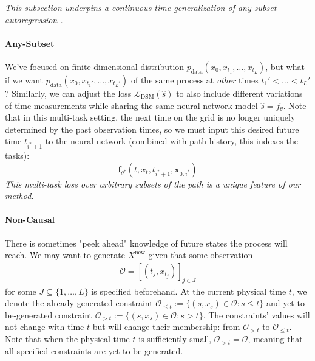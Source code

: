 \documentclass{article}
\begin{document}
\textit{This subsection underpins a continuous-time generalization of any-subset autoregression \cite{guo2025reviving, shih2022training}.}

\paragraph{Any-Subset}

We've focused on finite-dimensional  distribution $p_\text{data}(x_0, x_{t_1}, \ldots, x_{t_L})$, but what if we want
$p_\text{data}\left(x_0, x_{t_1'}, \ldots, x_{t_L'}\right)$ of the same process at \textit{other} times $t_{1}' < \ldots < t_{L}'$? Similarly, we can adjust the loss  $\mathcal{L}_{\text{DSM}}(\hat{s})$ to also include different variations of time measurements while sharing the same neural network model $\hat{s} = f_\theta$.
Note that in this multi-task setting, the next time on the grid is no longer uniquely determined by the past observation times, so we must input this desired future time $t_{i^*+1}$ to the neural network (combined with path history, this indexes the tasks):
\begin{equation}
    \mathbf{f}_{\theta^*}(t, x_t, t_{i^* + 1}, \mathbf{x}_{0:i^*})
\end{equation}
\textit{This multi-task loss over arbitrary subsets of the path is a unique feature of our method.}


\paragraph{Non-Causal}
There is sometimes "peek ahead" knowledge of future states the process will reach. We may want to generate $X^{\text{new}}$ given that some observation
\begin{align}
    \mathcal{O} = [(t_j, x_{t_j})]_{j \in J}
\end{align}
for some $J\subseteq \{1,\dots,L\}$ is specified beforehand. At the current physical time $t$, we denote the already-generated constraint $\mathcal{O}_{\le t} := \{(s,x_s)\in \mathcal{O}: s\le t\}$ and yet-to-be-generated constraint $\mathcal{O}_{> t} := \{(s,x_s)\in\mathcal{O}: s > t\}$. The constraints' values will not change with time $t$ but will change their membership: from $\mathcal{O}_{>t}$ to $\mathcal{O}_{\le t}$. Note that when the physical time $t$ is sufficiently small, $\mathcal{O}_{>t} = \mathcal{O}$, meaning that all specified constraints are yet to be generated.
\end{document}
